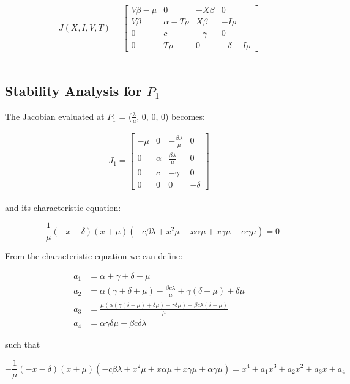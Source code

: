 \documentclass{article}
\begin{document}
\[J(X, I, V, T) =
	\begin{bmatrix}
		V \beta - \mu & 0 & -X \beta & 0 \\
		V \beta & \alpha - T \rho & X \beta & -I \rho \\
		0 & c & - \gamma & 0 \\
		0 & T \rho & 0 & - \delta + I \rho
	\end{bmatrix}
				\]\\

\subsection{Stability Analysis for $P_{1}$}

The Jacobian evaluated at $P_{1}$ = ($\frac{\lambda}{\mu}$, 0, 0, 0) becomes:

\[J_{1} =
	\begin{bmatrix}
		- \mu & 0 & - \frac{\beta \lambda}{\mu} & 0 \\
		0 & \alpha & \frac{\beta \lambda}{\mu} & 0 \\
		0 & c & - \gamma & 0 \\
		0 & 0 & 0 & - \delta
	\end{bmatrix}
\]\\

and its characteristic equation:

\begin{equation}
	- \frac{1}{\mu}(-x - \delta)(x + \mu)(-c \beta \lambda + x^2 \mu + x \alpha \mu + x \gamma \mu + \alpha \gamma \mu) = 0
\end{equation}

From the characteristic equation we can define:

\begin{equation}
	\begin{split}
		a_{1} &= \alpha + \gamma + \delta + \mu \\
		a_{2} &= \alpha (\gamma + \delta + \mu) - \frac{\beta c \lambda}{\mu} + \gamma (\delta + \mu) + \delta \mu \\
		a_{3} &= \frac{\mu (\alpha (\gamma (\delta + \mu) + \delta \mu) + \gamma \delta \mu ) - \beta c \lambda (\delta + \mu)}{\mu} \\
		a_{4} &= \alpha \gamma \delta \mu - \beta c \delta \lambda
	\end{split}
\end{equation}

such that

\begin{equation}
	- \frac{1}{\mu}(-x - \delta)(x + \mu)(-c \beta \lambda + x^2 \mu + x \alpha \mu + x\gamma \mu + \alpha \gamma \mu) = x^4 + a_{1}x^3 + a_{2}x^2 + a_{3}x + a_{4}
\end{equation}\\
\end{document}
